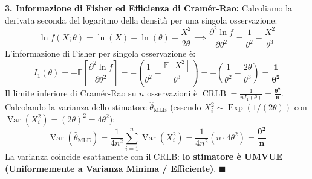 \begin{dimostrazione}
\textbf{3. Informazione di Fisher ed Efficienza di Cramér-Rao:}
Calcoliamo la derivata seconda del logaritmo della densità per una singola osservazione:
\begin{equation*}
    \ln f(X; \theta) = \ln(X) - \ln(\theta) - \frac{X^2}{2\theta} \implies \frac{\partial^2 \ln f}{\partial \theta^2} = \frac{1}{\theta^2} - \frac{X^2}{\theta^3}
\end{equation*}
L'informazione di Fisher per singola osservazione è:
\begin{equation*}
    I_1(\theta) = -\mathbb{E}\left[\frac{\partial^2 \ln f}{\partial \theta^2}\right] = -\left(\frac{1}{\theta^2} - \frac{\mathbb{E}[X^2]}{\theta^3}\right) = -\left(\frac{1}{\theta^2} - \frac{2\theta}{\theta^3}\right) = \bm{\frac{1}{\theta^2}}
\end{equation*}
Il limite inferiore di Cramér-Rao su $n$ osservazioni è $\operatorname{CRLB} = \frac{1}{n I_1(\theta)} = \bm{\frac{\theta^2}{n}}$.
Calcolando la varianza dello stimatore $\widehat{\theta}_{\text{MLE}}$ (essendo $X_i^2 \sim \operatorname{Exp}(1/(2\theta))$ con $\operatorname{Var}(X_i^2) = (2\theta)^2 = 4\theta^2$):
\begin{equation*}
    \operatorname{Var}\left(\widehat{\theta}_{\text{MLE}}\right) = \frac{1}{4n^2} \sum_{i=1}^n \operatorname{Var}(X_i^2) = \frac{1}{4n^2} (n \cdot 4\theta^2) = \bm{\frac{\theta^2}{n}}
\end{equation*}
La varianza coincide esattamente con il CRLB: \textbf{lo stimatore è UMVUE (Uniformemente a Varianza Minima / Efficiente)}. $\blacksquare$
\end{dimostrazione}

